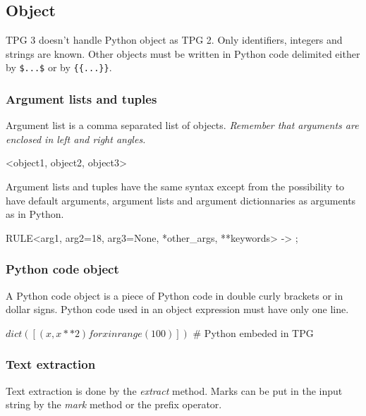 \subsection{Object}                                             \label{parser:object}

TPG 3 doesn't handle Python object as TPG 2.
Only identifiers, integers and strings are known.
Other objects must be written in Python code delimited either by \verb!$...$! or by \verb!{{...}}!.

\subsubsection{Argument lists and tuples}

Argument list is a comma separated list of objects.
\emph{Remember that arguments are enclosed in left and right angles.}

\begin{verbatimtab}[4]
    <object1, object2, object3>
\end{verbatimtab}

Argument lists and tuples have the same syntax except from the possibility to have
default arguments, argument lists and argument dictionnaries as arguments as in Python.

\begin{verbatimtab}[4]
    RULE<arg1, arg2=18, arg3=None, *other_args, **keywords> -> ;
\end{verbatimtab}

\subsubsection{Python code object}

A Python code object is a piece of Python code in double curly brackets or in dollar signs.
Python code used in an object expression must have only one line.

\begin{verbatimtab}[4]
    $ dict([ (x,x**2) for x in range(100) ]) $ # Python embeded in TPG
\end{verbatimtab}

\subsubsection{Text extraction}

Text extraction is done by the \emph{extract} method.
Marks can be put in the input string by the \emph{mark} method or the prefix \emph{\@} operator.

